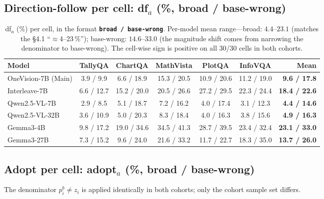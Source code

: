 \documentclass[11pt]{article}
\begin{document}
\subsection{Direction-follow per cell: df$_a$ (\%, broad / base-wrong)}

\begin{table}[h]
  \centering
  \small
  \begin{tabular}{lcccccr}
    \toprule
    \textbf{Model} & TallyQA & ChartQA & MathVista & PlotQA & InfoVQA & \textbf{Mean} \\
    \midrule
    OneVision-7B (Main) & 3.9 / 9.9  & 6.6 / 18.9  & 15.3 / 20.5 & 10.9 / 20.6 & 11.2 / 19.0 & \textbf{9.6 / 17.8} \\
    Interleave-7B       & 6.6 / 12.7 & 15.2 / 20.0 & 20.5 / 26.6 & 27.2 / 29.5 & 22.3 / 24.4 & \textbf{18.4 / 22.6} \\
    Qwen2.5-VL-7B       & 2.9 / 8.5  & 5.1 / 18.7  & 7.2 / 16.2  & 4.0 / 17.4  & 3.1 / 12.3  & \textbf{4.4 / 14.6} \\
    Qwen2.5-VL-32B      & 3.6 / 10.9 & 5.0 / 20.3  & 8.3 / 18.4  & 4.0 / 16.3  & 3.8 / 15.6  & \textbf{4.9 / 16.3} \\
    Gemma3-4B           & 9.8 / 17.2 & 19.0 / 34.6 & 34.5 / 41.3 & 28.7 / 39.5 & 23.4 / 32.4 & \textbf{23.1 / 33.0} \\
    Gemma3-27B          & 7.3 / 15.2 & 9.6 / 24.0  & 21.6 / 33.2 & 11.7 / 22.7 & 18.3 / 35.0 & \textbf{13.7 / 26.0} \\
    \bottomrule
  \end{tabular}
  \caption{df$_a$ (\%) per cell, in the format \textbf{\texttt{broad / base-wrong}}. Per-model mean range---broad: $\mathbf{4.4\text{--}23.1}$ (matches the \S4.1 ``$\approx$4--23\,\%''); base-wrong: $\mathbf{14.6\text{--}33.0}$ (the magnitude shift comes from narrowing the denominator to base-wrong). The cell-wise sign is positive on all 30/30 cells in both cohorts.}
  \label{tab:df-per-cell}
\end{table}

\subsection{Adopt per cell: adopt$_a$ (\%, broad / base-wrong)}

The denominator $p_i^b \neq z_i$ is applied identically in both cohorts; only the cohort sample set differs.
\end{document}
